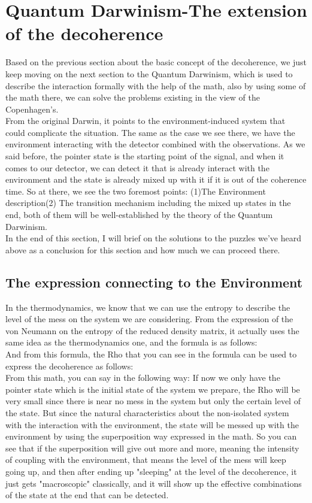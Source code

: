 \documentclass[final,1p,12pt]{elsarticle}
\begin{document}
\section{Quantum Darwinism-The extension of the decoherence}
Based on the previous section about the basic concept of the decoherence, we just keep moving on the next section to the Quantum Darwinism, which is used to describe the interaction formally with the help of the math, also by using some of the math there, we can solve the problems existing in the view of the Copenhagen's.\\
 
From the original Darwin, it points to the environment-induced system that could complicate the situation. The same as the case we see there, we have the environment interacting with the detector combined with the observations. As we said before, the pointer state is the starting point of the signal, and when it comes to our detector, we can detect it that is already interact with the environment and the state is already mixed up with it if it is out of the coherence time. So at there, we see the two foremost points: (1)The Environment description(2) The transition mechanism including the mixed up states in the end, both of them will be well-established by the theory of the Quantum Darwinism.\\

In the end of this section, I will brief on the solutions to the puzzles we've heard above as a conclusion for this section and how much we can proceed there.\\
\subsection{The expression connecting to the Environment}
In the thermodynamics, we know that we can use the entropy to describe the level of the mess on the system we are considering. From the expression of the von Neumann on the entropy of the reduced density matrix, it actually uses the same idea as the thermodynamics one, and the formula is as follows:\\

And from this formula, the Rho that you can see in the formula can be used to express the decoherence as follows:\\

From this math, you can say in the following way: If now we only have the pointer state which is the initial state of the system we prepare, the Rho will be very small since there is near no mess in the system but only the certain level of the state. But since the natural characteristics about the non-isolated system with the interaction with the environment, the state will be messed up with the environment by using the superposition way expressed in the math. So you can see that if the superposition will give out more and more, meaning the intensity of coupling with the environment, that means the level of the mess will keep going up, and then after ending up "sleeping" at the level of the decoherence, it just gets "macroscopic" classically, and it will show up the effective combinations of the state at the end that can be detected.\\
\end{document}

